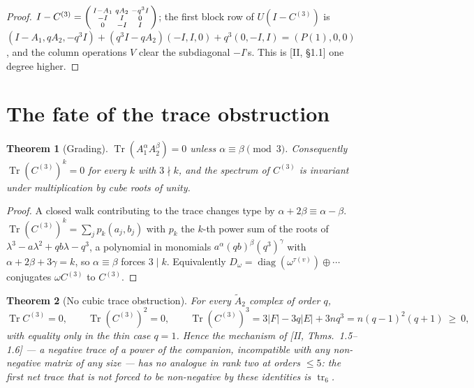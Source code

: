 \documentclass[11pt]{amsart}
\numberwithin{equation}{section}
\newtheorem{theorem}{Theorem}[section]
\theoremstyle{definition}
\theoremstyle{remark}
\newcommand{\Tr}{\operatorname{Tr}}
\newcommand{\tr}{\operatorname{tr}}
\newcommand{\Atwo}{\widetilde A_2}
\newcommand{\Cthree}{C^{(3)}}
\begin{document}
\begin{proof}
$I-\Cthree=\begin{psmallmatrix}I-A_1&qA_2&-q^{3}I\\-I&I&0\\0&-I&I\end{psmallmatrix}$; the
first block row of $U(I-\Cthree)$ is $(I-A_1,qA_2,-q^{3}I)+(q^{3}I-qA_2)(-I,I,0)
+q^{3}(0,-I,I)=(P(1),0,0)$, and the column operations $V$ clear the subdiagonal $-I$'s.
This is [II, \S1.1] one degree higher.
\end{proof}

\section{The fate of the trace obstruction}\label{sec:trace}

\begin{theorem}[Grading]\label{thm:grading}
$\Tr(A_1^{\alpha}A_2^{\beta})=0$ unless $\alpha\equiv\beta\pmod3$. Consequently
$\Tr(\Cthree)^{k}=0$ for every $k$ with $3\nmid k$, and the spectrum of $\Cthree$ is
invariant under multiplication by cube roots of unity.
\end{theorem}

\begin{proof}
A closed walk contributing to the trace changes type by $\alpha+2\beta\equiv\alpha-\beta$.
$\Tr(\Cthree)^{k}=\sum_jp_k(a_j,b_j)$ with $p_k$ the $k$-th power sum of the roots of
$\lambda^{3}-a\lambda^{2}+qb\lambda-q^{3}$, a polynomial in monomials $a^{\alpha}(qb)^{\beta}
(q^{3})^{\gamma}$ with $\alpha+2\beta+3\gamma=k$, so $\alpha\equiv\beta$ forces $3\mid k$.
Equivalently $D_\omega=\operatorname{diag}(\omega^{\tau(v)})\oplus\cdots$ conjugates
$\omega\Cthree$ to $\Cthree$.
\end{proof}

\begin{theorem}[No cubic trace obstruction]\label{thm:notrace}
For every $\Atwo$ complex of order $q$,
\[
\Tr\Cthree=0,\qquad\Tr(\Cthree)^{2}=0,\qquad
\Tr(\Cthree)^{3}=3|F|-3q|E|+3nq^{3}=n(q-1)^{2}(q+1)\ \ge\ 0,
\]
with equality only in the thin case $q=1$. Hence the mechanism of {\rm[II, Thms.~1.5--1.6]}
--- a negative trace of a power of the companion, incompatible with any non-negative
matrix of any size --- has no analogue in rank two at orders $\le5$: the first net trace
that is not forced to be non-negative by these identities is $\tr_6$.
\end{theorem}
\end{document}
